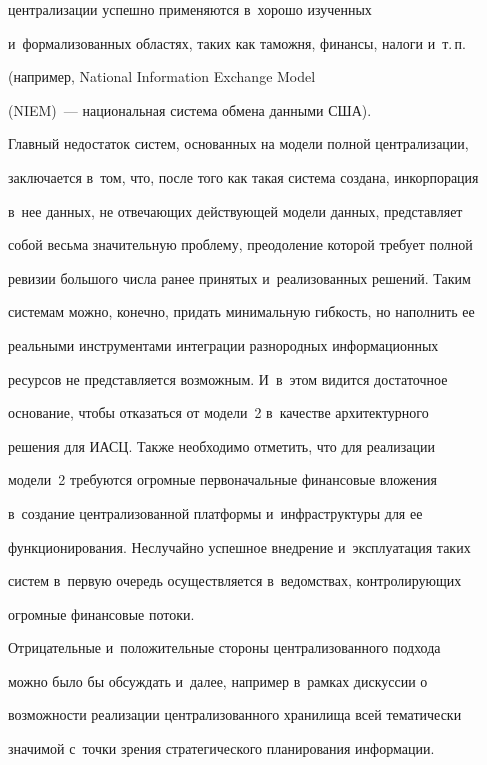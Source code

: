 централизации успешно применяются в~хорошо изученных 


и~формализованных областях, таких как таможня, финансы, налоги и~т.\,п.\ 


(например, National Information Exchange Model


(NIEM)~--- национальная система обмена данными США).





Главный недостаток систем, основанных на модели полной централизации, 


заключается в~том, что, после того как такая система создана, инкорпорация 


в~нее данных, не отвечающих действующей модели данных, представляет 


собой весьма значительную проблему, преодоление которой требует полной 


ревизии большого числа ранее принятых и~реализованных решений. Таким 


системам можно, конечно, придать минимальную гибкость, но наполнить ее 


реальными инструментами интеграции разнородных информационных 


ресурсов не пред\-став\-ля\-ет\-ся возможным. И~в~этом видится достаточное 


основание, чтобы отказаться от модели~2 в~качестве архитектурного 


решения для ИАСЦ. Также необходимо отметить, что для реализации 


модели~2 требуются огромные первоначальные финансовые вложения 


в~создание централизованной платформы и~инфраструктуры для ее 


функционирования. Неслучайно успешное внедрение и~эксплуатация таких 


сис\-тем в~первую очередь осуществляется в~ведомствах, контролирующих 


огромные финансовые потоки.





Отрицательные и~положительные стороны централизованного подхода 


можно было бы обсуждать и~далее, например в~рамках дискуссии о 


возможности реализации централизованного хранилища всей тематически 


значимой с~точки зрения стратегического планирования информации. 



